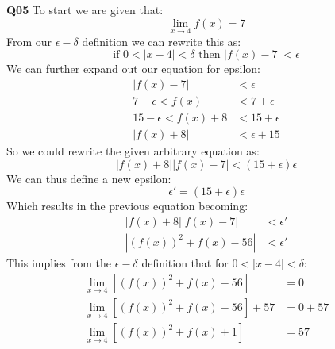 \documentclass[11pt]{article}
\begin{document}
\parindent=0pt

\textbf{Q05} To start we are given that:
\[ \lim_{x \to 4} f(x) = 7 \]
From our $\epsilon-\delta$ definition we can rewrite this as:
\[ \text{if } 0 < |x - 4| < \delta \text{ then } |f(x) - 7| < \epsilon \]
We can further expand out our equation for epsilon:
\begin{align*}
|f(x) - 7|  & < \epsilon\\
7 - \epsilon <  f(x)  & < 7 + \epsilon\\
15 - \epsilon <  f(x) + 8  & < 15 + \epsilon\\
|f(x) + 8|  & < \epsilon + 15
\end{align*}
So we could rewrite the given arbitrary equation as:
\[ |f(x) + 8||f(x) - 7| < (15 + \epsilon)\epsilon \]
We can thus define a new epsilon:
\[ \epsilon' = (15 + \epsilon)\epsilon  \]
Which results in the previous equation becoming:
\begin{align*}
|f(x) + 8||f(x) - 7| & <\epsilon' \\
|(f(x))^2 + f(x) - 56| & <\epsilon' 
\end{align*}
This implies from the  $\epsilon-\delta$ definition that for $ 0 < |x - 4| < \delta $:
\begin{align*}
 \lim_{x \to 4}[(f(x))^2 + f(x) - 56] & = 0 \\
 \lim_{x \to 4}[(f(x))^2 + f(x) - 56] + 57& = 0 + 57 \\
 \lim_{x \to 4}[(f(x))^2 + f(x) + 1] & = 57
\end{align*}
\end{document}
